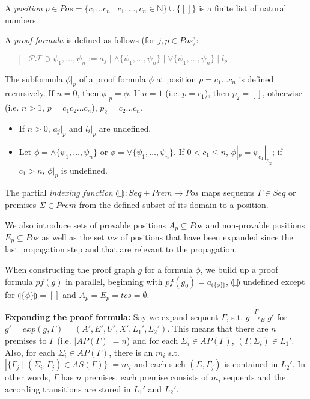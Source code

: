 \documentclass{llncs}
\newcommand{\ind}[1]{\llparenthesis #1 \rrparenthesis}
\begin{document}
\begin{definition}
A \emph{position} $p\in Pos=\{c_1\ldots c_n\mid c_1,\ldots,c_n\in\mathbb{N}\}\cup\{[]\}$ is a finite
list of natural numbers.

A \emph{proof formula} is defined as follows (for $j,p\in Pos$):
\begin{quote}
$\mathcal{PF} \ni \psi_1,\ldots,\psi_n := a_j \mid \wedge \{\psi_1,\ldots,\psi_n\} \mid \vee \{\psi_1,\ldots,\psi_n\} \mid l_p$
\end{quote}

The subformula $\phi|_p$ of a proof formula $\phi$ at position $p=c_1\ldots c_n$ is defined
recursively. If $n=0$, then $\phi|_p=\phi$. If $n=1$ (i.e. $p=c_1$), then $p_2=[]$, otherwise
(i.e. $n>1$, $p=c_1c_2\ldots c_n$), $p_2=c_2\ldots c_n$.
\begin{itemize}
\item If $n>0$, $a_j|_p$ and $l_i|_p$ are undefined.
\item Let $\phi=\wedge \{\psi_1,\ldots,\psi_n\}$ or $\phi=\vee \{\psi_1,\ldots,\psi_n\}$. If $0<c_1\leq n$,
$\phi|_p=\psi_{c_1}|_{p_2}$; if $c_1>n$, $\phi|_p$ is undefined.
\end{itemize}

The partial \emph{indexing function} $\ind{\_}:Seq + Prem \rightarrow Pos$
maps sequents $\Gamma\in Seq$ or premises $\Sigma\in Prem$ from the defined
subset of its domain to a position.

We also introduce sets of provable positions $A_p\subseteq Pos$ and non-provable
positions $E_p\subseteq Pos$ as well as the set $tcs$ of positions that have been
expanded since the last propagation step and that are relevant to the propagation.
\end{definition}

When constructing the proof graph $g$ for a formula $\phi$, we build up a proof formula
$pf(g)$ in parallel, beginning with $pf(g_0)=a_{\ind{\{\phi\}}}$, $\ind{\_}$ undefined except
for $\ind{\{\phi\}}=[]$ and $A_p=E_p=tcs=\emptyset$.

\noindent\textbf{Expanding the proof formula:} 
Say we expand sequent $\Gamma$, s.t. $g\stackrel{\Gamma}\rightarrow_E g'$ for $g'=exp(g,\Gamma)=(A',E',U',X',L_1',L_2')$.
This means that there are $n$ premises to $\Gamma$ (i.e. $|AP(\Gamma)|=n$) and for each $\Sigma_i \in AP(\Gamma)$,
$(\Gamma,\Sigma_i)\in L_1'$. Also, for each $\Sigma_i \in AP(\Gamma)$, there is an $m_i$ s.t.
$|\{\Gamma_j\mid (\Sigma_i,\Gamma_j)\in AS(\Gamma)\}|=m_i$ and each such $(\Sigma,\Gamma_j)$ is contained in $L_2'$.
In other words, $\Gamma$ has $n$ premises, each premise consists of $m_i$ sequents and the according
transitions are stored in $L_1'$ and $L_2'$.
\end{document}
